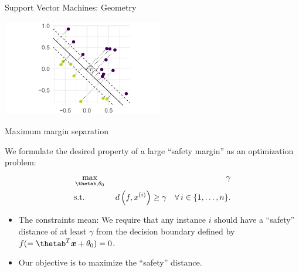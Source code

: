 \begin{vbframe}{Support Vector Machines: Geometry}
\begin{center}
\includegraphics[width =7cm]{figure_man/svm-geometry02.png} \\
\end{center}


\end{vbframe}

\begin{vbframe}{Maximum margin separation}

  We formulate the desired property of a large \enquote{safety margin} as an optimization problem:
  \begin{eqnarray*}
    & \max\limits_{\thetab, \theta_0} & \gamma \\
    & \text{s.t.} & \,\, d \left(f, \xi \right) \geq \gamma \quad \forall\, i \in \nset.
    \end{eqnarray*}

    \begin{itemize}
      \item The constraints mean: We require that any instance $i$ should have a \enquote{safety} distance of at least $\gamma$ from the decision boundary defined by $f (= \thetab^T \xv + \theta_0) = 0$.
      \item Our objective is to maximize the \enquote{safety} distance.
    \end{itemize}

\end{vbframe}


